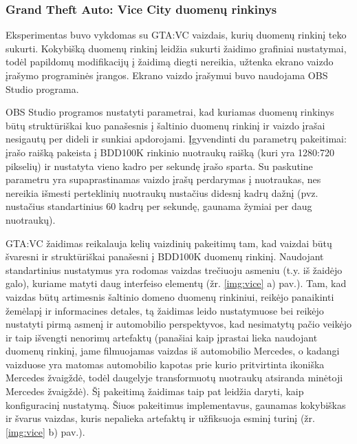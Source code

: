 \documentclass{VUMIFPSbakalaurinis}
\begin{document}
        \subsubsection{Grand Theft Auto: Vice City duomenų rinkinys}
            Eksperimentas buvo vykdomas su GTA:VC vaizdais, kurių duomenų rinkinį teko sukurti. Kokybišką duomenų rinkinį leidžia sukurti žaidimo grafiniai nustatymai, todėl papildomų modifikacijų į žaidimą diegti nereikia, užtenka ekrano vaizdo įrašymo programinės įrangos. Ekrano vaizdo įrašymui buvo naudojama OBS Studio programa.
            
            OBS Studio programos nustatyti parametrai, kad kuriamas duomenų rinkinys būtų struktūriškai kuo panašesnis į šaltinio duomenų rinkinį ir vaizdo įrašai nesigautų per dideli ir sunkiai apdorojami. Įgyvendinti du parametrų pakeitimai: įrašo raišką pakeista į BDD100K rinkinio nuotraukų raišką (kuri yra 1280:720 pikselių) ir nustatyta vieno kadro per sekundę įrašo sparta. Su paskutine parametru yra supaprastinamas vaizdo įrašų perdarymas į nuotraukas, nes nereikia išmesti perteklinių nuotraukų nustačius didesnį kadrų dažnį (pvz. nustačius standartinius 60 kadrų per sekundę, gaunama žymiai per daug nuotraukų).
            
            GTA:VC žaidimas reikalauja kelių vaizdinių pakeitimų tam, kad vaizdai būtų švaresni ir struktūriškai panašesni į BDD100K duomenų rinkinį. Naudojant standartinius nustatymus yra rodomas vaizdas trečiuoju asmeniu (t.y. iš žaidėjo galo), kuriame matyti daug interfeiso elementų (žr. \ref{img:vice} a) pav.). Tam, kad vaizdas būtų artimesnis šaltinio domeno duomenų rinkiniui, reikėjo panaikinti žemėlapį ir informacines detales, tą žaidimas leido nustatymuose bei reikėjo nustatyti pirmą asmenį ir automobilio perspektyvos, kad nesimatytų pačio veikėjo ir taip išvengti nenorimų artefaktų (panašiai kaip įprastai lieka naudojant \cite{DaimCityDaSe} duomenų rinkinį, jame filmuojamas vaizdas iš automobilio Mercedes, o kadangi vaizduose yra matomas automobilio kapotas prie kurio pritvirtinta ikoniška Mercedes žvaigždė, todėl daugelyje transformuotų nuotraukų atsiranda minėtoji Mercedes žvaigždė). Šį pakeitimą žaidimas taip pat leidžia daryti, kaip konfiguracinį nustatymą. Šiuos pakeitimus implementavus, gaunamas kokybiškas ir švarus vaizdas, kuris nepalieka artefaktų ir užfiksuoja esminį turinį (žr. \ref{img:vice} b) pav.).
\end{document}
